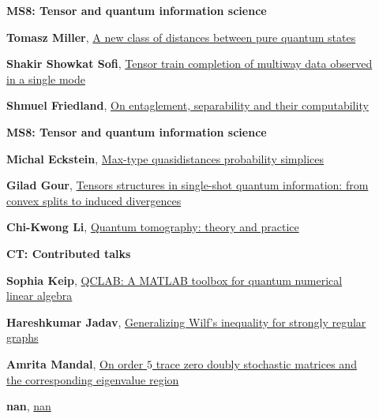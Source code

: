 \documentclass[ILAS2025-program.tex]{subfiles}
\begin{document}
        \begin{description}
    \item[] {\color{mstitle}\textbf{MS8: Tensor and quantum information science}} 
    \item[] \hypertarget{up0019}{}\textbf{Tomasz Miller}, \hyperlink{down0019}{A new class of distances between pure quantum states}
        \item[] \hypertarget{up0020}{}\textbf{Shakir Showkat Sofi}, \hyperlink{down0020}{Tensor train completion of multiway data observed in a single mode}
        \item[] \hypertarget{up0021}{}\textbf{Shmuel Friedland}, \hyperlink{down0021}{On entaglement, separability and their computability}
        \end{description}
    \begin{description}
    \item[] {\color{mstitle}\textbf{MS8: Tensor and quantum information science}} 
    \item[] \hypertarget{up0052}{}\textbf{Michal Eckstein}, \hyperlink{down0052}{Max-type quasidistances probability simplices}
        \item[] \hypertarget{up0053}{}\textbf{Gilad Gour}, \hyperlink{down0053}{Tensors structures in single-shot quantum information: from convex splits to induced divergences}
        \item[] \hypertarget{up0054}{}\textbf{Chi-Kwong Li}, \hyperlink{down0054}{Quantum tomography: theory and practice
}
        \end{description}
    \begin{description}
    \item[] {\color{mstitle}\textbf{CT: Contributed talks}} 
    \item[] \hypertarget{up0088}{}\textbf{Sophia Keip}, \hyperlink{down0088}{QCLAB: A MATLAB toolbox for quantum numerical linear algebra}
        \item[] \hypertarget{up0089}{}\textbf{Hareshkumar Jadav}, \hyperlink{down0089}{Generalizing Wilf's inequality for strongly regular graphs}
        \item[] \hypertarget{up0090}{}\textbf{Amrita Mandal}, \hyperlink{down0090}{On order $5$ trace zero doubly stochastic matrices and the corresponding eigenvalue region}
        \item[] \hypertarget{up0091}{}\textbf{nan}, \hyperlink{down0091}{nan}
        \end{description}
    \newpage
\end{document}
